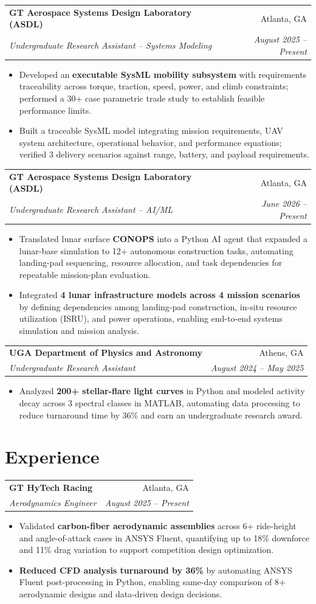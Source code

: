 \documentclass[letterpaper,10pt]{article}
\makeatletter
\newcommand{\resumeSubheading}[4]{
\vspace{2pt}
\begin{tabular*}{\textwidth}{@{}l@{\extracolsep{\fill}}r@{}}
\textbf{#1} & #2 \\
\textit{#3} & \textit{#4} \\
\end{tabular*}\vspace{-5pt}
}
\newcommand{\resumeItemListStart}{
\begin{itemize}[
leftmargin=0.17in,
label=\textbullet,
itemsep=0pt,
topsep=0pt,
parsep=0pt,
partopsep=0pt
]
}
\newcommand{\resumeItemListEnd}{
\end{itemize}\vspace{-1pt}
}
\makeatother
\begin{document}
\resumeSubheading
{GT Aerospace Systems Design Laboratory (ASDL)}{Atlanta, GA}
{Undergraduate Research Assistant -- Systems Modeling}{August 2025 -- Present}
\resumeItemListStart
\item Developed an \textbf{executable SysML mobility subsystem} with requirements traceability across torque, traction, speed, power, and climb constraints; performed a 30+ case parametric trade study to establish feasible performance limits.
\item Built a traceable SysML model integrating mission requirements, UAV system architecture, operational behavior, and performance equations; verified 3 delivery scenarios against range, battery, and payload requirements.
\resumeItemListEnd

\resumeSubheading
{GT Aerospace Systems Design Laboratory (ASDL)}{Atlanta, GA}
{Undergraduate Research Assistant -- AI/ML}{June 2026 -- Present}
\resumeItemListStart
\item Translated lunar surface \textbf{CONOPS} into a Python AI agent that expanded a lunar-base simulation to 12+ autonomous construction tasks, automating landing-pad sequencing, resource allocation, and task dependencies for repeatable mission-plan evaluation.
\item Integrated \textbf{4 lunar infrastructure models across 4 mission scenarios} by defining dependencies among landing-pad construction, in-situ resource utilization (ISRU), and power operations, enabling end-to-end systems simulation and mission analysis.
\resumeItemListEnd

\resumeSubheading
{UGA Department of Physics and Astronomy}{Athens, GA}
{Undergraduate Research Assistant}{August 2024 -- May 2025}
\resumeItemListStart
\item Analyzed \textbf{200+ stellar-flare light curves} in Python and modeled activity decay across 3 spectral classes in MATLAB, automating data processing to reduce turnaround time by 36\% and earn an undergraduate research award.
\resumeItemListEnd

\section{Experience}

\resumeSubheading
{GT HyTech Racing}{Atlanta, GA}
{Aerodynamics Engineer}{August 2025 -- Present}
\resumeItemListStart
\item Validated \textbf{carbon-fiber aerodynamic assemblies} across 6+ ride-height and angle-of-attack cases in ANSYS Fluent, quantifying up to 18\% downforce and 11\% drag variation to support competition design optimization.
\item \textbf{Reduced CFD analysis turnaround by 36\%} by automating ANSYS Fluent post-processing in Python, enabling same-day comparison of 8+ aerodynamic designs and data-driven design decisions.
\resumeItemListEnd
\end{document}
